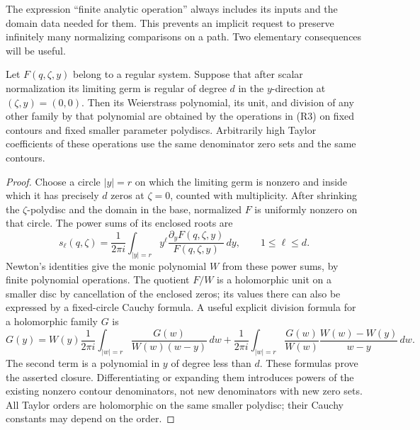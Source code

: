 The expression ``finite analytic operation'' always includes its inputs
and the domain data needed for them.  This prevents an implicit request
to preserve infinitely many normalizing comparisons on a path.  Two
elementary consequences will be useful.

\begin{lemma}\label{path:prepared-contours}
Let \(F(q,\zeta,y)\) belong to a regular system.  Suppose that after
scalar normalization its limiting germ is regular of degree \(d\) in
the \(y\)-direction at \((\zeta,y)=(0,0)\).  Then its Weierstrass
polynomial, its unit, and division of any other family by that polynomial
are obtained by the operations in \textup{(R3)} on fixed contours and
fixed smaller parameter polydiscs.  Arbitrarily high Taylor coefficients
of these operations use the same denominator zero sets and the same
contours.
\end{lemma}
\begin{proof}
Choose a circle \(|y|=r\) on which the limiting germ is nonzero and
inside which it has precisely \(d\) zeros at \(\zeta=0\), counted
with multiplicity.  After shrinking the \(\zeta\)-polydisc and the
domain in the base, normalized \(F\) is uniformly nonzero on that
circle.  The power sums of its enclosed roots are
\[
 s_\ell(q,\zeta)=\frac1{2\pi i}\int_{|y|=r}
        y^\ell\frac{\partial_yF(q,\zeta,y)}{F(q,\zeta,y)}\,dy,
 \qquad 1\le\ell\le d.
\]
Newton's identities give the monic polynomial \(W\) from these power
sums, by finite polynomial operations.  The quotient \(F/W\) is a
holomorphic unit on a smaller disc by cancellation of the enclosed
zeros; its values there can also be expressed by a fixed-circle Cauchy
formula.  A useful explicit division formula for a holomorphic family
\(G\) is
\[
 G(y)=W(y)\frac1{2\pi i}\int_{|w|=r}
       \frac{G(w)}{W(w)(w-y)}\,dw
   +\frac1{2\pi i}\int_{|w|=r}
       \frac{G(w)}{W(w)}\frac{W(w)-W(y)}{w-y}\,dw.
\]
The second term is a polynomial in \(y\) of degree less than \(d\).
These formulas prove the asserted closure.  Differentiating or expanding
them introduces powers of the existing nonzero contour denominators,
not new denominators with new zero sets.  All Taylor orders are
holomorphic on the same smaller polydisc; their Cauchy constants may
depend on the order.
\end{proof}

